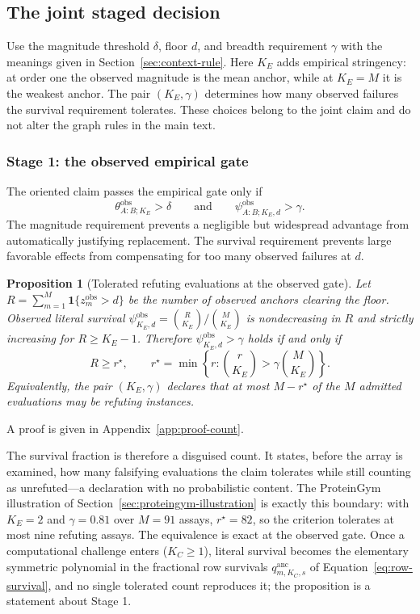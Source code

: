 \documentclass[11pt]{article}
\newtheorem{proposition}{Proposition}
\theoremstyle{remark}
\begin{document}
\subsection{The joint staged decision}
\label{sec:decision}

Use the magnitude threshold $\delta$, floor $d$, and breadth requirement
$\gamma$ with the meanings given in Section~\ref{sec:context-rule}. Here
$K_E$ adds empirical stringency: at order one the observed magnitude is the
mean anchor, while at $K_E=M$ it is the weakest anchor. The pair
$(K_E,\gamma)$ determines how many observed failures the survival requirement
tolerates. These choices belong to the joint claim and do not alter the graph
rules in the main text.

\subsubsection{Stage 1: the observed empirical gate}

The oriented claim passes the empirical gate only if
\begin{equation}
\theta^{\mathrm{obs}}_{A:B;K_E}>\delta
\qquad\text{and}\qquad
\psi^{\mathrm{obs}}_{A:B;K_E,d}>\gamma.
\label{eq:observed-gate}
\end{equation}
The magnitude requirement prevents a negligible but widespread advantage from
automatically justifying replacement. The survival requirement prevents large
favorable effects from compensating for too many observed failures at $d$.

\begin{proposition}[Tolerated refuting evaluations at the observed gate]
\label{prop:count}
Let $R=\sum_{m=1}^M\mathbf 1\{z_m^{\mathrm{obs}}>d\}$ be the number of observed
anchors clearing the floor. Observed literal survival
$\psi^{\mathrm{obs}}_{K_E,d}=\binom{R}{K_E}/\binom{M}{K_E}$ is nondecreasing
in $R$ and strictly increasing for $R\geq K_E-1$. Therefore
$\psi^{\mathrm{obs}}_{K_E,d}>\gamma$ holds if and only if
\[
R\geq r^\star,
\qquad
r^\star=\min\left\{r:\binom{r}{K_E}>\gamma\binom{M}{K_E}\right\}.
\]
Equivalently, the pair $(K_E,\gamma)$ declares that at most $M-r^\star$ of the
$M$ admitted evaluations may be refuting instances.
\end{proposition}

A proof is given in Appendix~\ref{app:proof-count}.

The survival fraction is therefore a disguised count. It states, before the
array is examined, how many falsifying evaluations the claim tolerates while
still counting as unrefuted---a declaration with no probabilistic content. The
ProteinGym illustration of Section~\ref{sec:proteingym-illustration} is exactly
this boundary: with $K_E=2$ and $\gamma=0.81$ over $M=91$ assays, $r^\star=82$,
so the criterion tolerates at most nine refuting assays. The equivalence is
exact at the observed gate. Once a computational challenge enters ($K_C\geq1$),
literal survival becomes the elementary symmetric polynomial in the fractional
row survivals $q^{\mathrm{anc}}_{m,K_C,s}$ of Equation~\eqref{eq:row-survival},
and no single tolerated count reproduces it; the proposition is a statement
about Stage 1.
\end{document}
